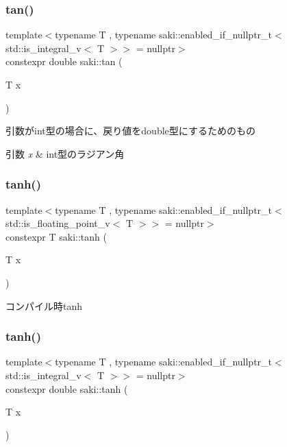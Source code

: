 \subsubsection{\texorpdfstring{tan()}{tan()}\hspace{0.1cm}{\footnotesize\ttfamily [2/2]}}
{\footnotesize\ttfamily template$<$typename T , typename saki\+::enabled\+\_\+if\+\_\+nullptr\+\_\+t$<$ std\+::is\+\_\+integral\+\_\+v$<$ T $>$$>$  = nullptr$>$ \\
constexpr double saki\+::tan (\begin{DoxyParamCaption}\item[{T}]{x }\end{DoxyParamCaption})}



引数がint型の場合に、戻り値をdouble型にするためのもの 


\begin{DoxyParams}{引数}
{\em x} & int型のラジアン角 \\
\hline
\end{DoxyParams}
\mbox{\label{namespacesaki_af2674216630169ce211f8076492ce14e}} 
\subsubsection{\texorpdfstring{tanh()}{tanh()}\hspace{0.1cm}{\footnotesize\ttfamily [1/2]}}
{\footnotesize\ttfamily template$<$typename T , typename saki\+::enabled\+\_\+if\+\_\+nullptr\+\_\+t$<$ std\+::is\+\_\+floating\+\_\+point\+\_\+v$<$ T $>$$>$  = nullptr$>$ \\
constexpr T saki\+::tanh (\begin{DoxyParamCaption}\item[{T}]{x }\end{DoxyParamCaption})}



コンパイル時tanh 

\mbox{\label{namespacesaki_a5faf83bc9a4a7e981275deba551d2f3f}} 
\subsubsection{\texorpdfstring{tanh()}{tanh()}\hspace{0.1cm}{\footnotesize\ttfamily [2/2]}}
{\footnotesize\ttfamily template$<$typename T , typename saki\+::enabled\+\_\+if\+\_\+nullptr\+\_\+t$<$ std\+::is\+\_\+integral\+\_\+v$<$ T $>$$>$  = nullptr$>$ \\
constexpr double saki\+::tanh (\begin{DoxyParamCaption}\item[{T}]{x }\end{DoxyParamCaption})}



